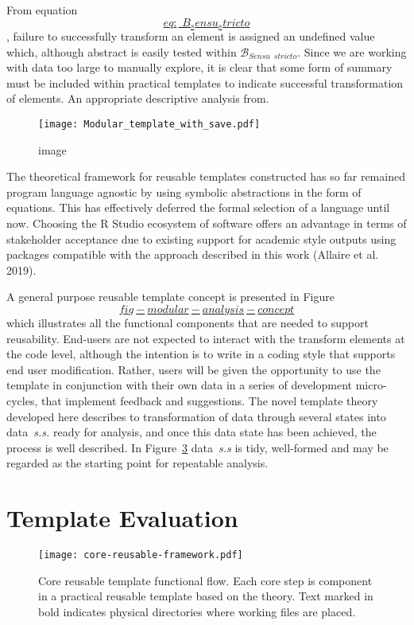 \documentclass[
]{article}
\begin{document}
From
equation~\protect\hyperlink{eq:_B_sensu_stricto}{\[eq:\_B_sensu_stricto\]},
failure to successfully transform an element is assigned an undefined
value which, although abstract is easily tested within
\(\mathscr{B}_{Sensu \enspace stricto}\). Since we are working with data
too large to manually explore, it is clear that some form of summary
must be included within practical templates to indicate successful
transformation of elements. An appropriate descriptive analysis from.

\begin{figure}
\centering
\texttt{[image: Modular\_template\_with\_save.pdf]}
\caption{image}
\end{figure}

The theoretical framework for reusable templates constructed has so far
remained program language agnostic by using symbolic abstractions in the
form of equations. This has effectively deferred the formal selection of
a language until now. Choosing the R Studio ecosystem of software offers
an advantage in terms of stakeholder acceptance due to existing support
for academic style outputs using packages compatible with the approach
described in this work (Allaire et al. 2019).

A general purpose reusable template concept is presented in
Figure~\protect\hyperlink{fig-modular-analysis-concept}{\[fig-modular-analysis-concept\]}
which illustrates all the functional components that are needed to
support reusability. End-users are not expected to interact with the
transform elements at the code level, although the intention is to write
in a coding style that supports end user modification. Rather, users
will be given the opportunity to use the template in conjunction with
their own data in a series of development micro-cycles, that implement
feedback and suggestions. The novel template theory developed here
describes to transformation of data through several states into
data~\emph{s.s.} ready for analysis, and once this data state has been
achieved, the process is well described. In
Figure~\protect\hyperlink{fig_essential_template}{3} data~\emph{s.s} is
tidy, well-formed and may be regarded as the starting point for
repeatable analysis.

\hypertarget{template-evaluation}{%
\section{Template Evaluation}\label{template-evaluation}}

\begin{figure}
\hypertarget{fig_core_functional_flow}{%
\centering
\texttt{[image: core-reusable-framework.pdf]}
\caption{Core reusable template functional flow. Each core step is
component in a practical reusable template based on the theory. Text
marked in bold indicates physical directories where working files are
placed.}\label{fig_core_functional_flow}
}
\end{figure}
\end{document}
